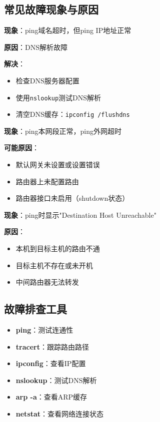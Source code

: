 \documentclass[12pt,a4paper]{ctexart}
\begin{document}
\subsection{常见故障现象与原因}

\begin{exambox}[故障1：无法访问域名]
\textbf{现象}：ping域名超时，但ping IP地址正常

\textbf{原因}：DNS解析故障

\textbf{解决}：
\begin{itemize}[itemsep=0pt]
    \item 检查DNS服务器配置
    \item 使用\texttt{nslookup}测试DNS解析
    \item 清空DNS缓存：\texttt{ipconfig /flushdns}
\end{itemize}
\end{exambox}

\begin{exambox}[故障2：无法访问外网]
\textbf{现象}：ping本网段正常，ping外网超时

\textbf{可能原因}：
\begin{itemize}[itemsep=0pt]
    \item 默认网关未设置或设置错误
    \item 路由器上未配置路由
    \item 路由器接口未启用（shutdown状态）
\end{itemize}
\end{exambox}

\begin{exambox}
\textbf{现象}：ping时显示"Destination Host Unreachable"

\textbf{原因}：
\begin{itemize}[itemsep=0pt]
    \item 本机到目标主机的路由不通
    \item 目标主机不存在或未开机
    \item 中间路由器无法转发
\end{itemize}
\end{exambox}

\subsection{故障排查工具}

\begin{itemize}[leftmargin=2em,itemsep=0pt]
    \item \textbf{ping}：测试连通性
    \item \textbf{tracert}：跟踪路由路径
    \item \textbf{ipconfig}：查看IP配置
    \item \textbf{nslookup}：测试DNS解析
    \item \textbf{arp -a}：查看ARP缓存
    \item \textbf{netstat}：查看网络连接状态
\end{itemize}
\end{document}
